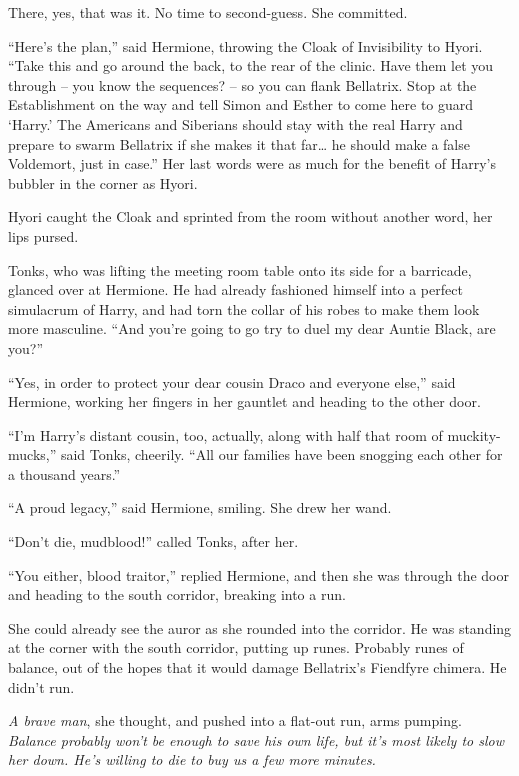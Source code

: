 There, yes, that was it. No time to second-guess. She committed.

``Here's the plan,'' said Hermione, throwing the Cloak of Invisibility
to Hyori. ``Take this and go around the back, to the rear of the clinic.
Have them let you through -- you know the sequences? -- so you can flank
Bellatrix. Stop at the Establishment on the way and tell Simon and
Esther to come here to guard `Harry.' The Americans and Siberians should
stay with the real Harry and prepare to swarm Bellatrix if she makes it
that far\ldots{} he should make a false Voldemort, just in case.'' Her
last words were as much for the benefit of Harry's bubbler in the corner
as Hyori.

Hyori caught the Cloak and sprinted from the room without another word,
her lips pursed.

Tonks, who was lifting the meeting room table onto its side for a
barricade, glanced over at Hermione. He had already fashioned himself
into a perfect simulacrum of Harry, and had torn the collar of his robes
to make them look more masculine. ``And you're going to go try to duel
my dear Auntie Black, are you?''

``Yes, in order to protect your dear cousin Draco and everyone else,''
said Hermione, working her fingers in her gauntlet and heading to the
other door.

``I'm Harry's distant cousin, too, actually, along with half that room
of muckity-mucks,'' said Tonks, cheerily. ``All our families have been
snogging each other for a thousand years.''

``A proud legacy,'' said Hermione, smiling. She drew her wand.

``Don't die, mudblood!'' called Tonks, after her.

``You either, blood traitor,'' replied Hermione, and then she was
through the door and heading to the south corridor, breaking into a run.

She could already see the auror as she rounded into the corridor. He was
standing at the corner with the south corridor, putting up runes.
Probably runes of balance, out of the hopes that it would damage
Bellatrix's Fiendfyre chimera. He didn't run.

\emph{A brave man}, she thought, and pushed into a flat-out run, arms
pumping. \emph{Balance probably won't be enough to save his own life,
but it's most likely to slow her down. He's willing to die to buy us a
few more minutes.}


